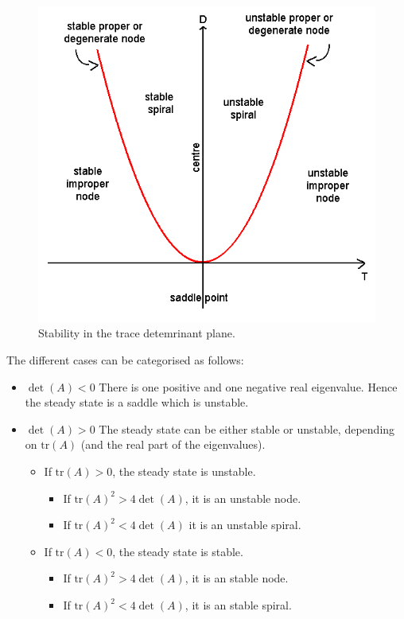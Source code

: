 \documentclass[
  letterpaper,
  DIV=11,
  numbers=noendperiod]{scrreprt}
\providecommand{\tightlist}{%
  \setlength{\itemsep}{0pt}\setlength{\parskip}{0pt}}\usepackage{longtable,booktabs,array}
\begin{document}
\begin{figure}

{\centering \includegraphics{TDPlane.png}

}

\caption{\label{fig-tdplane}Stability in the trace detemrinant plane.}

\end{figure}

The different cases can be categorised as follows:

\begin{itemize}
\item
  \(\det(A)<0\) There is one positive and one negative real eigenvalue.
  Hence the steady state is a saddle which is unstable.
\item
  \(\det(A)>0\) The steady state can be either stable or unstable,
  depending on \(\mathrm{tr}(A)\) (and the real part of the
  eigenvalues).

  \begin{itemize}
  \tightlist
  \item
    If \(\mathrm{tr}(A)>0\), the steady state is unstable.

    \begin{itemize}
    \tightlist
    \item
      If \(\mathrm{tr}(A)^2>4 \det(A)\), it is an unstable node.
    \item
      If \(\mathrm{tr}(A)^2<4 \det(A)\) it is an unstable spiral.
    \end{itemize}
  \item
    If \(\mathrm{tr}(A)<0\), the steady state is stable.

    \begin{itemize}
    \tightlist
    \item
      If \(\mathrm{tr}(A)^2>4 \det(A)\), it is an stable node.
    \item
      If \(\mathrm{tr}(A)^2<4 \det(A)\), it is an stable spiral.
    \end{itemize}
  \end{itemize}
\end{itemize}
\end{document}
